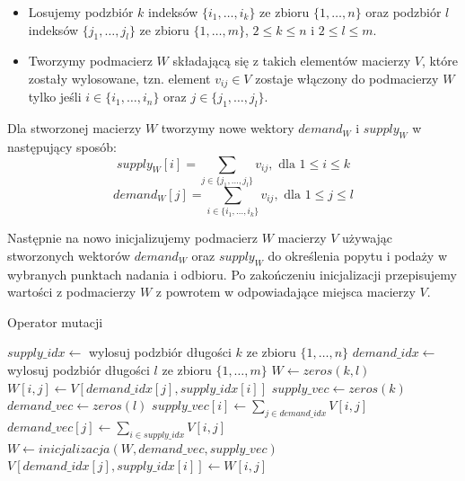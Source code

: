 \begin{itemize}
    \item Losujemy podzbiór $k$ indeksów $\{i_1, \dots, i_k\}$ ze zbioru $\{1, \dots, n\}$ oraz podzbiór $l$ indeksów $\{j_1, \dots, j_l\}$ 
    ze zbioru $\{1, \dots, m\}$, $2 \le k \le n$ i $2 \le l \le m$.
    \item Tworzymy podmacierz $W$ składającą się z takich elementów macierzy $V$, które zostały wylosowane, tzn. element $v_{ij} \in V$ 
    zostaje włączony do podmacierzy $W$ tylko jeśli $i \in \{i_1, \dots, i_n\}$ oraz $j \in \{j_1, \dots, j_l\}$.
\end{itemize}

Dla stworzonej macierzy $W$ tworzymy nowe wektory $demand_W$ i $supply_W$ w następujący sposób:
$$supply_W[i] = \sum_{j \in \{j_1, \dots, j_l\}} v_{ij}, \text{ dla } 1 \le i \le k$$
$$demand_W[j] = \sum_{i \in \{i_1, \dots, i_k\}} v_{ij}, \text{ dla } 1 \le j \le l$$

Następnie na nowo inicjalizujemy podmacierz $W$ macierzy $V$ używając stworzonych wektorów $demand_W$ oraz $supply_W$ do określenia popytu i podaży 
w wybranych punktach nadania i odbioru. Po zakończeniu inicjalizacji przepisujemy wartości z podmacierzy $W$ z powrotem w odpowiadające miejsca 
macierzy $V$.

\begin{pseudokod}[H]
    \label{mutacja}
    \caption{Operator mutacji}
    \BlankLine
    $supply\_idx \gets$ wylosuj podzbiór długości $k$ ze zbioru $\{1, \dots, n\}$\;
    $demand\_idx \gets$ wylosuj podzbiór długości $l$ ze zbioru $\{1, \dots, m\}$\;
    $W \gets zeros(k, l)$
    \BlankLine
     {
         {
            $W[i, j] \gets V[demand\_idx[j], supply\_idx[i]]$\;
        }
    }
    \BlankLine
    $supply\_vec \gets zeros(k)$
    $demand\_vec \gets zeros(l)$
    \BlankLine
     {
        $supply\_vec[i] \gets \sum_{j \in demand\_idx} V[i, j]$\;
    }
    \BlankLine
     {
        $demand\_vec[j] \gets \sum_{i \in supply\_idx} V[i, j]$\;
    }
    \BlankLine
    $W \gets inicjalizacja(W, demand\_vec, supply\_vec)$\;
    \BlankLine
     {
         {
            $V[demand\_idx[j], supply\_idx[i]] \gets W[i, j]$\;
        }
    }
    
\end{pseudokod}

